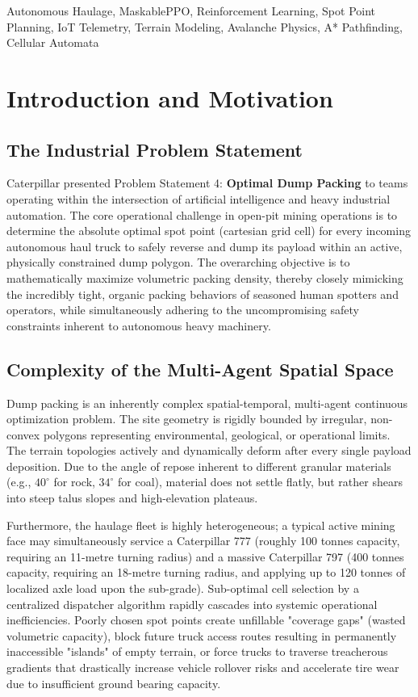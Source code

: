 \documentclass[conference]{IEEEtran}
\begin{document}
\begin{IEEEkeywords}
Autonomous Haulage, MaskablePPO, Reinforcement Learning, Spot Point Planning, IoT Telemetry, Terrain Modeling, Avalanche Physics, A* Pathfinding, Cellular Automata
\end{IEEEkeywords}

\section{Introduction and Motivation}

\subsection{The Industrial Problem Statement}
Caterpillar presented Problem Statement 4: \textbf{Optimal Dump Packing} to teams operating within the intersection of artificial intelligence and heavy industrial automation. The core operational challenge in open-pit mining operations is to determine the absolute optimal spot point (cartesian grid cell) for every incoming autonomous haul truck to safely reverse and dump its payload within an active, physically constrained dump polygon. The overarching objective is to mathematically maximize volumetric packing density, thereby closely mimicking the incredibly tight, organic packing behaviors of seasoned human spotters and operators, while simultaneously adhering to the uncompromising safety constraints inherent to autonomous heavy machinery.

\subsection{Complexity of the Multi-Agent Spatial Space}
Dump packing is an inherently complex spatial-temporal, multi-agent continuous optimization problem. The site geometry is rigidly bounded by irregular, non-convex polygons representing environmental, geological, or operational limits. The terrain topologies actively and dynamically deform after every single payload deposition. Due to the angle of repose inherent to different granular materials (e.g., $40^\circ$ for rock, $34^\circ$ for coal), material does not settle flatly, but rather shears into steep talus slopes and high-elevation plateaus. 

Furthermore, the haulage fleet is highly heterogeneous; a typical active mining face may simultaneously service a Caterpillar 777 (roughly 100 tonnes capacity, requiring an 11-metre turning radius) and a massive Caterpillar 797 (400 tonnes capacity, requiring an 18-metre turning radius, and applying up to 120 tonnes of localized axle load upon the sub-grade). Sub-optimal cell selection by a centralized dispatcher algorithm rapidly cascades into systemic operational inefficiencies. Poorly chosen spot points create unfillable "coverage gaps" (wasted volumetric capacity), block future truck access routes resulting in permanently inaccessible "islands" of empty terrain, or force trucks to traverse treacherous gradients that drastically increase vehicle rollover risks and accelerate tire wear due to insufficient ground bearing capacity.
\end{document}
